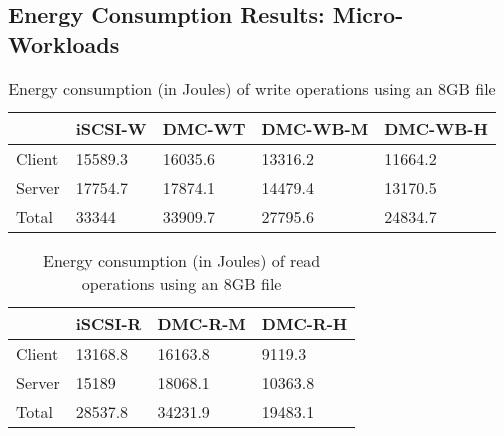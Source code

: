 \subsection{Energy Consumption Results: Micro-Workloads}

\begin{table}
  \centering
  \resizebox{\linewidth}{!}
  {
    \begin{tabular}{|l|l|l|l|l|}
      \hline & \bf iSCSI-W & \bf DMC-WT & \bf DMC-WB-M & \bf DMC-WB-H \\ \hline
      Client & 15589.3     & 16035.6    & 13316.2      & 11664.2      \\ \hline
      Server & 17754.7     & 17874.1    & 14479.4      & 13170.5      \\ \hline
      Total  & 33344       & 33909.7    & 27795.6      & 24834.7      \\ \hline
    \end{tabular}
  }
  \caption{Energy consumption (in Joules) of write operations using an 8GB file}
  \label{tab:write-energy}
\end{table}

\begin{table}
  \centering
  \resizebox{\linewidth}{!}
  {
    \begin{tabular}{|l|l|l|l|}
      \hline & \bf iSCSI-R & \bf DMC-R-M & \bf DMC-R-H \\ \hline
      Client & 13168.8     & 16163.8     & 9119.3      \\ \hline
      Server & 15189       & 18068.1     & 10363.8     \\ \hline
      Total  & 28537.8     & 34231.9     & 19483.1     \\ \hline
    \end{tabular}
  }
  \caption{Energy consumption (in Joules) of read operations using an 8GB file}
  \label{tab:read-energy}
\end{table}


